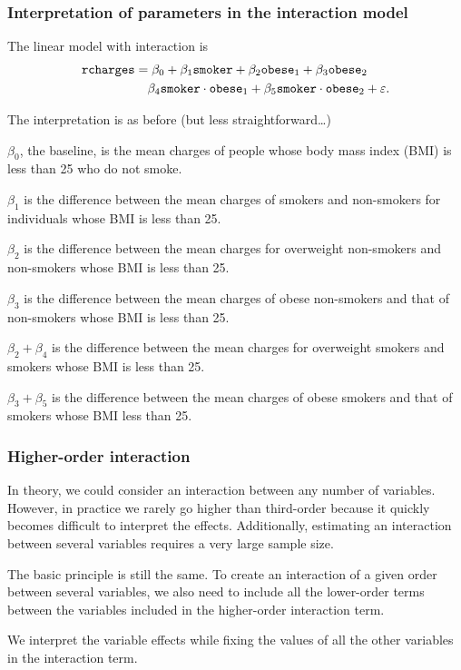 \documentclass{beamer}
\begin{document}
\begin{frame}[fragile]
\frametitle{Interpretation of parameters in the interaction model}
The linear model with interaction is
{ \small 
\begin{align*}
\texttt{rcharges} &= \beta_0 + \beta_1 \texttt{smoker} + \beta_2 \texttt{obese}_1 +  \beta_3 \texttt{obese}_2 \\ & \quad \beta_4\texttt{smoker}\cdot\texttt{obese}_1  + \beta_5\texttt{smoker}\cdot\texttt{obese}_2  + \varepsilon. 
\end{align*}
}
 \bi
  \item The interpretation is as before (but less straightforward\ldots)
{\footnotesize  
\bi
\item $\beta_0$, the baseline, is the mean charges of people whose body mass index (BMI) is less than 25 who do not smoke.
\item $\beta_1$ is the difference between the mean charges of smokers and non-smokers for individuals whose BMI is less than 25.
\item $\beta_2$ is the difference between the mean charges  for overweight non-smokers and non-smokers whose BMI is less than 25.
\item $\beta_3$ is the difference between the mean charges  of obese non-smokers and that of non-smokers whose BMI is less than 25.
\item $\beta_2 + \beta_4$ is the difference between the mean charges  for overweight smokers and smokers whose BMI is less than 25.
\item $\beta_3 + \beta_5$ is the difference between the mean charges  of obese smokers and that of smokers whose BMI less than 25.
\ei
}
\ei
\end{frame}



\begin{frame}
\frametitle{Higher-order interaction}
\bi
\item In theory, we could consider an \alert{interaction between any number of variables}. However, in practice we rarely go higher than third-order because it quickly becomes difficult to interpret the effects. Additionally, estimating an interaction between several variables requires a very large sample size. 
\item The basic principle is still the same. To create an interaction of a given order between several variables, we also need to include all the lower-order terms between the variables included in the higher-order interaction term. 
\item We interpret the variable effects while fixing the values of all the other variables in the interaction term. 
\ei
\end{frame}
\end{document}

